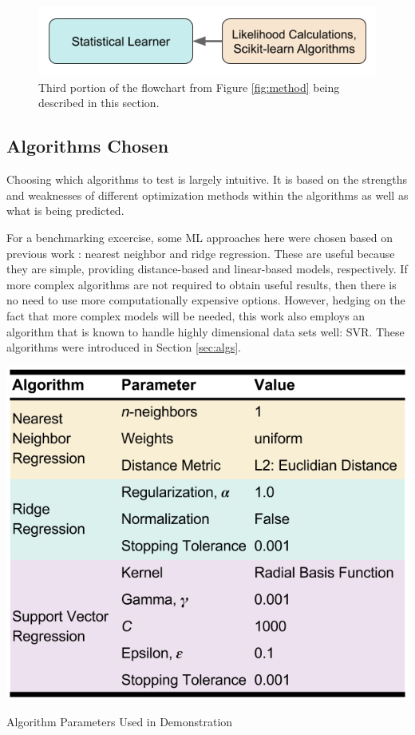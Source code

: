
\begin{figure}[H]
  \centering
  \includegraphics[width=0.7\linewidth]{./chapters/method/methodology3.png}
  \caption{Third portion of the flowchart from Figure \ref{fig:method} being 
           described in this section.}
\end{figure}

\subsection{Algorithms Chosen}
\label{sec:choice}

Choosing which algorithms to test is largely intuitive. It is based on the
strengths and weaknesses of different optimization methods within the
algorithms as well as what is being predicted.  

For a benchmarking excercise, some \gls{ML} approaches here were chosen
based on previous work \cite{dayman_feasibility_2013}: nearest neighbor and
ridge regression. These are useful because they are simple, providing
distance-based and linear-based models, respectively. If more complex
algorithms are not required to obtain useful results, then there is no need to
use more computationally expensive options. However, hedging on the fact that
more complex models will be needed, this work also employs an algorithm that is
known to handle highly dimensional data sets well: \acrfull{SVR}.
These algorithms were introduced in Section \ref{sec:algs}. 

\begin{table}[!htb]
  \centering
  \includegraphics[width=0.8\linewidth]{./chapters/method/defaults.png}
  \caption{Algorithm Parameters Used in Demonstration}
  \label{tbl:defaults}
\end{table}

